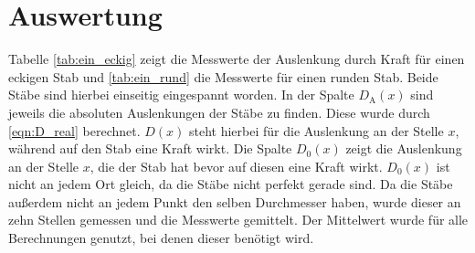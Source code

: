 \section{Auswertung}
\label{sec:Auswertung}
Tabelle \ref{tab:ein_eckig} zeigt die Messwerte der Auslenkung durch Kraft für einen eckigen Stab und \ref{tab:ein_rund} die Messwerte für einen runden Stab.
Beide Stäbe sind hierbei einseitig eingespannt worden.
In der Spalte $D_\text{A}(x)$ sind jeweils die absoluten Auslenkungen der Stäbe zu finden.
Diese wurde durch \eqref{eqn:D_real} berechnet.
$D(x)$ steht hierbei für die Auslenkung an der Stelle $x$, während auf den Stab eine Kraft wirkt.
Die Spalte $D_0(x)$ zeigt die Auslenkung an der Stelle $x$, die der Stab hat bevor auf diesen eine Kraft wirkt.
$D_0(x)$ ist nicht an jedem Ort gleich, da die Stäbe nicht perfekt gerade sind.
Da die Stäbe außerdem nicht an jedem Punkt den selben Durchmesser haben, wurde dieser an zehn Stellen gemessen und die Messwerte gemittelt.
Der Mittelwert wurde für alle Berechnungen genutzt, bei denen dieser benötigt wird.
